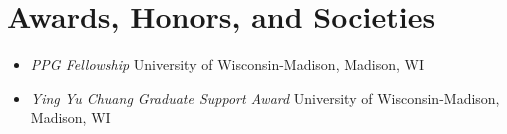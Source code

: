 \section{Awards, Honors, and Societies}

\begin{itemize}
    \item \textit{PPG Fellowship} \hfill University of Wisconsin-Madison, Madison, WI
    \item \textit{Ying Yu Chuang Graduate Support Award} \hfill University of Wisconsin-Madison, Madison, WI
\end{itemize}

